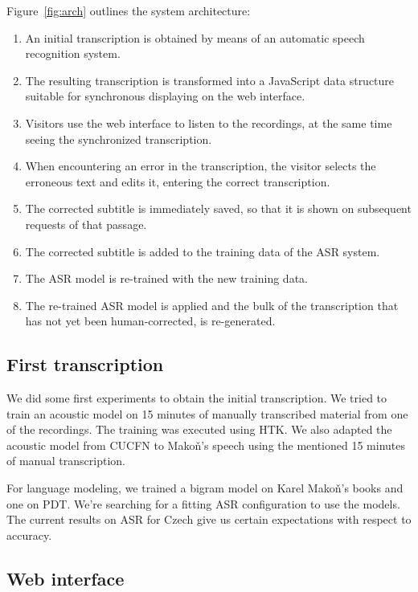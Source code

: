 \documentclass{llncs}
\begin{document}
Figure~\ref{fig:arch} outlines the system architecture:
\begin{enumerate}
\item{An initial transcription is obtained by means of an automatic speech recognition
system.\label{enum:arch:init}}
\item{The resulting transcription is transformed into a JavaScript data
structure suitable for synchronous displaying on the web
interface.\label{enum:arch:htk2sub}}
\item{Visitors use the web interface to listen to the recordings,
at the same time seeing the synchronized transcription.}
\item{When encountering an error in the transcription, the visitor selects the
erroneous text and edits it, entering the correct transcription.}
\item{The corrected subtitle is immediately saved, so that it is shown on
subsequent requests of that passage.}
\item{The corrected subtitle is added to the training data of the ASR system.}
\item{The ASR model is re-trained with the new training data.}
\item{The re-trained ASR model is applied and the bulk of the transcription that
has not yet been human-corrected, is re-generated.}
\end{enumerate}

\subsection{First transcription}

We did some first experiments to obtain the initial transcription. We tried
to train an acoustic model on 15 minutes of manually transcribed material from
one of the recordings. The training was executed using HTK\cite{htk}. We also
adapted the acoustic model from CUCFN\cite{cucfn} to Makoň's speech using the
mentioned 15 minutes of manual transcription.

For language modeling, we trained a bigram model on Karel Makoň's books and one
on PDT\cite{pdt}. We're searching for a fitting ASR configuration to use the
models. The current results on ASR for Czech\cite{czasr} give us certain
expectations with respect to accuracy.

\subsection{Web interface}
\end{document}
